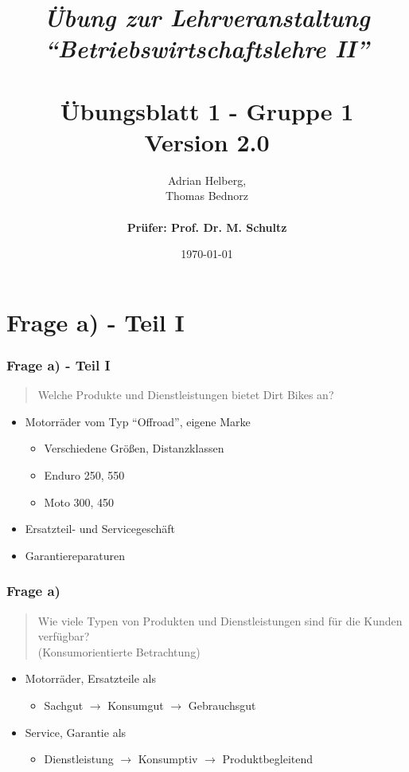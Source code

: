 \documentclass{beamer}
\title{
	\textit{\"Ubung zur Lehrveranstaltung ``Betriebswirtschaftslehre II''} \\
	\textbf{\\ \"Ubungsblatt 1 - Gruppe 1} \\
	\scriptsize{Version 2.0}
}
\author{Adrian Helberg, \\ Thomas Bednorz \\\textbf{\\ Prüfer: Prof. Dr. M. Schultz}}
\date{\today}
\begin{document}

\maketitle

\frame{\tableofcontents}

\section{Frage a) - Teil I}
\begin{frame}
\frametitle{Frage a) - Teil I}

\begin{quote}
Welche Produkte und Dienstleistungen bietet Dirt Bikes an? 
\end{quote}

\begin{itemize}
\setlength{\itemsep}{20pt}
\item Motorr\"ader vom Typ ``Offroad'', eigene Marke
\begin{itemize}
\item Verschiedene Gr\"oßen, Distanzklassen
\item Enduro 250, 550
\item Moto 300, 450
\end{itemize}
\item Ersatzteil- und Servicegesch\"aft
\item Garantiereparaturen
\end{itemize}

\end{frame}

\begin{frame}
\frametitle{Frage a)}

\begin{quote}
Wie viele Typen von Produkten und Dienstleistungen sind für die Kunden verfügbar? \\
(Konsumorientierte Betrachtung)
\end{quote}

\begin{itemize}
\setlength{\itemsep}{12pt}
\item Motorräder, Ersatzteile als
\begin{itemize}
\item Sachgut $\rightarrow$ Konsumgut $\rightarrow$ Gebrauchsgut
\end{itemize}
\item Service, Garantie als
\begin{itemize}
\item Dienstleistung $\rightarrow$ Konsumptiv $\rightarrow$ Produktbegleitend
\end{itemize}
\end{itemize}

\end{frame}
\end{document}
